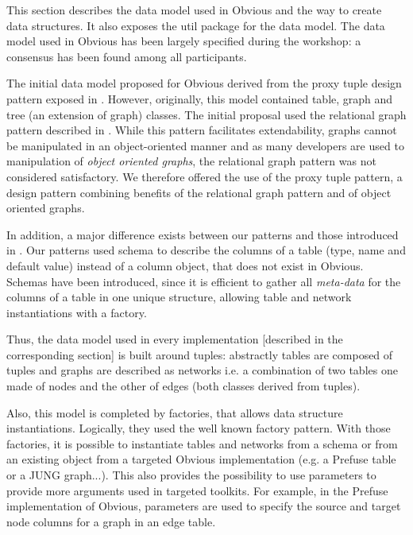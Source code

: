 This section describes the data model used in Obvious and the way to
create data structures. It also exposes the util package for the data
model.  The data model used in Obvious has been largely specified
during the workshop: a consensus has been found among all
participants.

The initial data model proposed for Obvious derived from the proxy tuple
design pattern exposed in \cite{DesignPatternsIV}. However, originally, this model
contained table, graph and tree (an extension of graph) classes. The initial proposal
used the relational graph pattern described in \cite{DesignPatternsIV}. 
While this pattern facilitates extendability, graphs cannot be manipulated in an
object-oriented manner and as many developers are used to manipulation of
 \emph{object oriented graphs}, the relational graph pattern was not considered
 satisfactory.  We therefore offered the use of the proxy tuple pattern, a
design pattern combining benefits of the relational graph pattern and
of object oriented graphs.

In addition, a major difference exists between our patterns and those
introduced in \cite{DesignPatternsIV}. Our patterns used schema to describe
the columns of a table (type, name and default value) instead of a column object,
that does not exist in Obvious. Schemas have been introduced, since it
is efficient to gather all \emph{meta-data} for the columns of a
table in one unique structure, allowing table and network instantiations
with a factory.

Thus, the data model used in every implementation [described in the
  corresponding section] is built around tuples: abstractly tables are
composed of tuples and graphs are described as networks i.e. a
combination of two tables one made of nodes and the other of edges
(both classes derived from tuples).

Also, this model is completed by factories, that allows data structure
instantiations. Logically, they used the well known factory
pattern. With those factories, it is possible to instantiate tables
and networks from a schema or from an existing object from a targeted
Obvious implementation (e.g. a Prefuse table or a JUNG graph...). This also
provides the possibility to use parameters to provide more arguments
used in targeted toolkits. For example, in the Prefuse implementation
of Obvious, parameters are used to specify the source and target node columns
for a graph in an edge table.


